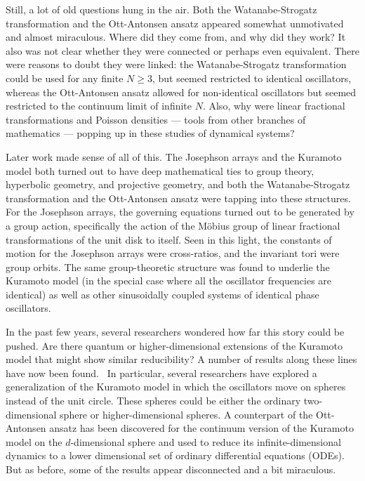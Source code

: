 \documentclass[%
 aip,
 amsmath,amssymb,
 reprint,%
]{revtex4-1}
\begin{document}
Still, a lot of old questions hung in the air. Both the Watanabe-Strogatz transformation  and the Ott-Antonsen ansatz appeared somewhat unmotivated and almost miraculous. Where  did they come from, and why did they work? It also was not clear whether they were  connected or perhaps even equivalent. There were reasons to doubt they were linked:  the Watanabe-Strogatz transformation could be used for any finite $N \geq 3$, but seemed restricted to identical oscillators, whereas the Ott-Antonsen ansatz allowed for non-identical  oscillators but seemed restricted to the continuum limit of infinite $N$. Also, why were linear fractional transformations and Poisson densities --- tools from other branches of  mathematics --- popping up in these studies of dynamical systems? 

Later work made sense of all of this. The Josephson arrays and the Kuramoto model  both turned out to have deep mathematical ties to group theory, hyperbolic geometry, and  projective geometry, and both the Watanabe-Strogatz transformation and the Ott-Antonsen  ansatz were tapping into these structures.~\cite{pikovsky2015dynamics,pikovsky2008partially,marvel2009identical,stewart2011phase,chen2017hyperbolic,chen2019dynamics} For the Josephson arrays, the governing equations  turned out to be generated by a group action, specifically the action of the Möbius group of linear fractional transformations of the unit disk to itself. Seen in this light, the constants of  motion for the Josephson arrays were cross-ratios, and the invariant tori were group orbits. The  same group-theoretic structure was found to underlie the Kuramoto model (in the special case  where all the oscillator frequencies are identical) as well as other sinusoidally coupled systems  of identical phase oscillators.\cite{marvel2009identical, chen2017hyperbolic}  

In the past few years, several researchers wondered how far this story could be pushed.  Are there quantum or higher-dimensional extensions of the Kuramoto model that might show  similar reducibility? A number of results along these lines have now been found.~\cite{lohe2009non,tanaka2014solvable,chi2014emergent, ha2016collective, ha2018relaxation, lohe2018higher, jacimovic2018low, chandra2019continuous, chandra2019complexity, lohe2019systems, deville2019synchronization, ha2021constants, jacimovic2021reversibility,dai2021d} In particular,  several researchers have explored a generalization of the Kuramoto model in which the  oscillators move on spheres instead of the unit circle. These spheres could be either the  ordinary two-dimensional sphere or higher-dimensional spheres. A counterpart of the Ott-Antonsen ansatz has been discovered for the continuum version of the Kuramoto model on the  $d$-dimensional sphere and used to reduce its infinite-dimensional dynamics to a lower dimensional set of ordinary differential equations (ODEs).~\cite{chandra2019complexity} But as before, some of the results appear disconnected and a bit miraculous.  
\end{document}
